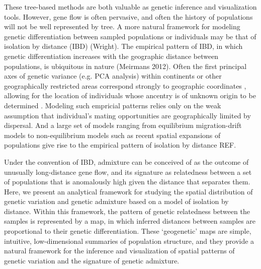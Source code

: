 \documentclass[12pt]{article}
\newcommand{\gb}[1]{{\em \color{magenta} #1}}
\begin{document}
These tree-based methods are both valuable as genetic inference and visualization tools.  However, gene flow is often pervasive, and often the history of populations will not be well represented by tree. A more natural framework for modeling genetic differentiation between sampled populations or individuals may be that of isolation by distance (IBD) (Wright). 
The empirical pattern of IBD, in which genetic differentiation increases with the geographic distance between populations, is ubiquitous in nature (Meirmans 2012). 
Often the first principal axes of genetic variance (e.g. PCA analysis) within continents or other geographically restricted areas correspond strongly to geographic coordinates \citep{SPA},
allowing for the location of individuals whose ancentry is of unknown origin to be determined \citep{Novembre,SPA,SPAmix}.
Modeling such empricial patterns relies only on the weak assumption that individual's mating opportunities are geographically limited by dispersal.
And a large set of models ranging from equilibrium migration-drift models to non-equilibrium models 
such as recent spatial expansions of populations give rise to the empirical pattern of isolation by distance REF. 

Under the convention of IBD, admixture can be conceived of as the outcome of unusually long-distance gene flow, and its signature as relatedness between a set of populations that is anomalously high given the distance that separates them.  Here, we present an analytical framework for studying the spatial distribution of genetic variation and genetic admixture based on a model of isolation by distance. Within this framework, the pattern of genetic relatedness between the samples is represented by a map, in which inferred distances between samples are proportional to their genetic differentiation.  These `geogenetic'  maps are simple, intuitive, low-dimensional summaries of population structure, and they provide a natural framework for the inference and visualization of spatial patterns of genetic variation and the signature of genetic admixture.


\end{document}
